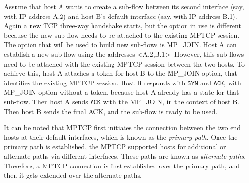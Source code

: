 Assume that host A wants to create a sub-flow between its second interface (say, with IP address A.2) and host B's default interface (say, with IP address B.1). Again a new TCP three-way handshake starts, but the option in use is different because the new sub-flow needs to be attached to the existing MPTCP session. The option that will be used to build new sub-flows is MP\_JOIN. Host A can establish a new sub-flow using the addresses <A.2,B.1>.
However, this sub-flows need to be attached with the existing MPTCP session between the two hosts. To achieve this, host A attaches a token for host B to the MP\_JOIN option, that identifies the existing MPTCP session. Host B responds with \texttt{SYN} and \texttt{ACK}, with MP\_JOIN option without a token, because host A already has a state for that sub-flow. Then host A sends \texttt{ACK} with the MP\_JOIN, in the context of host B. Then host B sends the final ACK, and the sub-flow is ready to be used.

It can be noted that MPTCP first initiates the connection between the two end hosts at their default interfaces, which is known as the \textit{primary path}. Once the primary path is established, the MPTCP supported hosts for additional or alternate paths via different interfaces. These paths are known as \textit{alternate paths}. Therefore, a MPTCP connection is first established over the primary path, and then it gets extended over the alternate paths. 

